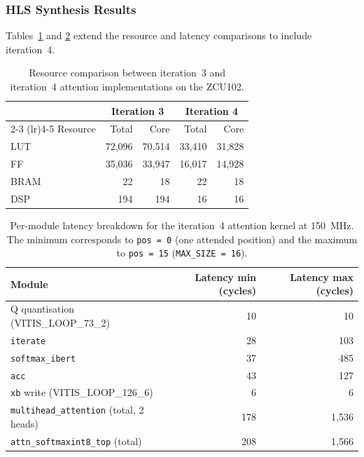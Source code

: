 \subsubsection{HLS Synthesis Results}
\label{subsec:attn_ibert_csyn}

Tables~\ref{tab:attn_all_resources_iter4} and \ref{tab:attn_kvint8_iter4_latency}
extend the resource and latency comparisons to include iteration~4.

\begin{table}[H]
  \centering
  \begin{tabular}{lrrrr}
    \toprule
    & \multicolumn{2}{c}{Iteration 3} & \multicolumn{2}{c}{Iteration 4} \\
    \cmidrule(lr){2-3} \cmidrule(lr){4-5}
    Resource & Total & Core & Total & Core \\
    \midrule
    LUT  & 72{,}096 & 70{,}514 & 33{,}410 & 31{,}828 \\
    FF   & 35{,}036 & 33{,}947 & 16{,}017 & 14{,}928 \\
    BRAM & 22       & 18       & 22       & 18 \\
    DSP  & 194      & 194      & 16       & 16 \\
    \bottomrule
  \end{tabular}
  \caption{Resource comparison between iteration~3 and iteration~4 attention
           implementations on the ZCU102.}
  \label{tab:attn_all_resources_iter4}
\end{table}

\begin{table}[H]
  \centering
  \begin{tabular}{lrr}
    \toprule
    Module & Latency min (cycles) & Latency max (cycles) \\
    \midrule
    Q quantisation (VITIS\_LOOP\_73\_2)  & 10  &  10 \\
    \texttt{iterate}                     & 28  & 103 \\
    \texttt{softmax\_ibert}              & 37  & 485 \\
    \texttt{acc}                         & 43  & 127 \\
    \texttt{xb} write (VITIS\_LOOP\_126\_6) &  6  &   6 \\
    \texttt{multihead\_attention} (total, 2 heads) & 178 & 1{,}536 \\
    \texttt{attn\_softmaxint8\_top} (total) & 208 & 1{,}566 \\
    \bottomrule
  \end{tabular}
  \caption{Per-module latency breakdown for the iteration~4 attention
           kernel at \SI{150}{\mega\hertz}. The minimum corresponds to
           \texttt{pos\,=\,0} (one attended position) and the maximum
           to \texttt{pos\,=\,15} (\texttt{MAX\_SIZE\,=\,16}).}
  \label{tab:attn_kvint8_iter4_latency}
\end{table}

